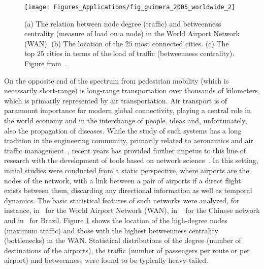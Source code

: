 \begin{figure}[t!]
\centering
\texttt{[image: Figures\_Applications/fig\_guimera\_2005\_worldwide\_2]}
\caption{(a) The relation between node degree (traffic) and betweenness centrality (measure of load on a node) in the World Airport Network (WAN). (b) The location of the $25$ most connected cities. (c) The top $25$ cities in terms of the load of traffic (betweenness centrality). Figure from~\cite{guimera_2005_worldwide}. \label{fig:guimera_2005_worldwide_2}}
\end{figure}

On the opposite end of the spectrum from pedestrian mobility (which is necessarily short-range) is long-range transportation over thousands of kilometers, which is primarily represented by air transportation. Air transport is of paramount importance for modern global connectivity, playing a central role in the world economy and in the interchange of people, ideas and, unfortunately, also the propagation of diseases. 
While the study of such systems has a long tradition in the engineering community, primarily related to aeronautics and air traffic management~\cite{belobaba_2009_global,cook_2007_european}, recent years has provided further impetus to this line of research with the development of tools based on network science~\cite{Newman_book}. In this setting, initial studies were conducted from a static perspective, where airports are the nodes of the network, with a link between a pair of airports if a direct flight exists between them, discarding any directional information as well as temporal dynamics. The basic statistical features of such networks were analyzed, for instance, in~\cite{guimera_2004_modeling,barrat_2004_architecture,guimera_2005_worldwide} for the World Airport Network (WAN), in ~\cite{li_2004_statistical} for the Chinese network and in~\cite{da_2009_structural} for Brazil. Figure \ref{fig:guimera_2005_worldwide_2} shows the location of the high-degree nodes (maximum traffic) and those with the highest betweenness centrality (bottlenecks) in the WAN. Statistical distributions of the degree (number of destinations of the airports), the traffic (number of passengers per route or per airport) and betweenness were found to be typically heavy-tailed. 

